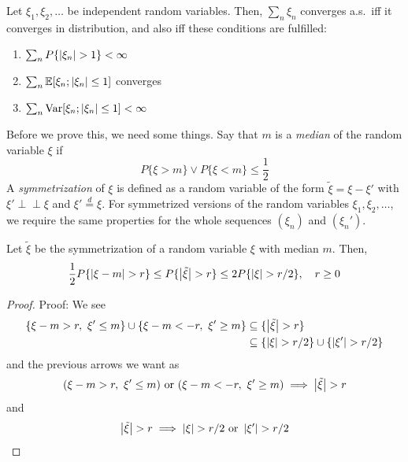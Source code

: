 
\begin{theorem}
    Let $\xi_1, \xi_2, \ldots$ be independent random variables. Then, $\sum_n \xi_n$ converges a.s.\ iff it converges in distribution, and also iff these conditions are fulfilled:
    \begin{enumerate}[label = (\roman*)]
        \item $\sum_n P\{\left\lvert {\xi_n} \right\rvert > 1\} < \infty$
        \item $\sum_n \mathbb{E}[\xi_n ; \left\lvert {\xi_n} \right\rvert \leq 1]$ converges
        \item $\sum_n \operatorname{Var}[\xi_n ; \left\lvert {\xi_n} \right\rvert \leq 1] < \infty$
    \end{enumerate}
\end{theorem}

Before we prove this, we need some things. Say that $m$ is a \emph{median} of the random variable $\xi$ if
\[ P\{\xi > m\} \vee P\{\xi < m\} \leq \frac{1}{2} \]
A \emph{symmetrization} of $\xi$ is defined as a random variable of the form $\tilde{\xi} = \xi - \xi'$ with $\xi' \perp\!\!\!\perp \xi$ and $\xi' \overset{d}{=} \xi$. For symmetrized versions of the random variables $\xi_1, \xi_2, \ldots$, we require the same properties for the whole sequences $(\xi_n)$ and $(\xi_n')$.

\begin{lemma}
    Let $\tilde{\xi}$ be the symmetrization of a random variable $\xi$ with median $m$. Then,
    \[ \frac{1}{2}P\{\left\lvert {\xi - m} \right\rvert > r\} \leq P\{\left\lvert {\tilde{\xi}} \right\rvert > r\} \leq 2P\{\left\lvert {\xi} \right\rvert > r/2\}, \quad r \geq 0 \]
\end{lemma}
\begin{proof}{Proof:}
    We see
    \begin{align*}
        \{\xi - m > r,\ \xi' \leq m\} \cup \{\xi - m < -r,\ \xi' \geq m\} &\subseteq \{\left\lvert {\tilde{\xi}} \right\rvert > r\}\\
        &\subseteq \{\left\lvert {\xi} \right\rvert > r/2\} \cup \{\left\lvert {\xi'} \right\rvert > r/2\}
    \end{align*}
    and the previous arrows we want as
    \[ (\xi - m > r,\ \xi' \leq m) \text{ or } (\xi - m < -r,\ \xi' \geq m) \implies \left\lvert {\tilde{\xi}} \right\rvert > r \]
    and
    \[ \left\lvert {\tilde{\xi}} \right\rvert > r \implies \left\lvert {\xi} \right\rvert > r/2 \text{ or } \left\lvert {\xi'} \right\rvert > r/2 \]
\end{proof}

